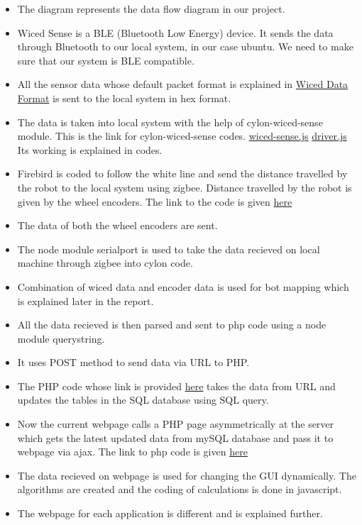 \documentclass[a4paper,12pt,oneside]{book}
\begin{document}
\begin{itemize}
  \item The diagram represents the data flow diagram in our project.
  \item Wiced Sense is a BLE (Bluetooth Low Energy) device. It sends the data through Bluetooth to our local system, in our case ubuntu. We need to make sure that our system is BLE compatible.
  \item All the sensor data whose default packet format is explained in \href{https://github.com/eYSIP-2016/Wiced-Sense/blob/master/Documentation/Sensor%20Data%20Format/Sensor_Data_Format.pdf}{Wiced Data Format} is sent to the local system in hex format.

  \item The data is taken into local system with the help of cylon-wiced-sense module. This is the link for cylon-wiced-sense codes.
  \href{https://github.com/eYSIP-2016/Wiced-Sense/blob/master/Codes/Nodejs/wiced-sense.js}{wiced-sense.js}
  \href{https://github.com/eYSIP-2016/Wiced-Sense/blob/master/Codes/Nodejs/driver.js}{driver.js} Its working is explained in codes.
  

  \newpage
  \item Firebird is coded to follow the white line and send the distance travelled by the robot to the local system using zigbee. Distance travelled by the robot is given by the wheel encoders. The link to the code is given \href{https://github.com/eYSIP-2016/Wiced-Sense/tree/master/Codes/FireBird_Codes/Firebird2}{here}
  \item The data of both the wheel encoders are sent.
  \item The node module serialport is used to take the data recieved on local machine through zigbee into cylon code.
  \item Combination of wiced data and encoder data is used for bot mapping which 
  is explained later in the report.
  \item All the data recieved is then parsed and sent to php code using a node module querystring.
  \item It uses POST method to send data via URL to PHP.
  \item The PHP code whose link is provided \href{https://github.com/eYSIP-2016/Wiced-Sense/blob/master/Codes/wiced%20web/controller/test.php}{here} takes the data from URL and updates the tables in the SQL database using SQL query.
    
  \item Now the current webpage calls a PHP page asymmetrically at the server which gets the latest updated data from mySQL database and pass it to webpage via ajax. The link to php code is given \href{https://github.com/eYSIP-2016/Wiced-Sense/blob/master/Codes/wiced%20web/controller/new.php}{here}
  
  \item The data recieved on webpage is used for changing the GUI dynamically. The algorithms are created and the coding of calculations is done in javascript.
  
  \item The webpage for each application is different and is explained further.
\end{itemize}
\end{document}
